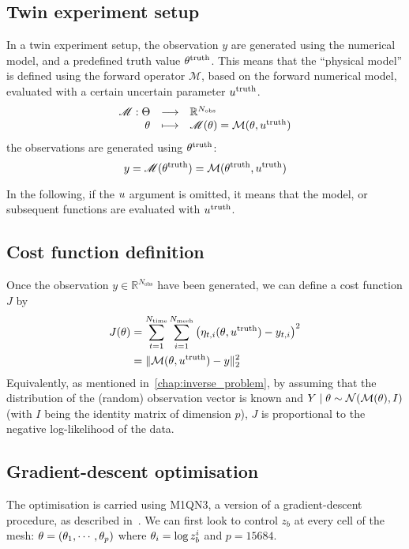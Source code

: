 \documentclass[../../Main_ManuscritThese.tex]{subfiles}
\newcommand{\zob}{z_b}
\begin{document}
\subsection{Twin experiment setup}
In a twin experiment setup, the observation $y$ are generated using
the numerical model, and a predefined truth value
$\theta^{\mathrm{truth}}$.  This means that the ``physical model'' is
defined using the forward operator $\mathscr{M}$, based on the forward
numerical model, evaluated with a certain uncertain parameter
$u^{\mathrm{truth}}$.
\begin{equation}
  \label{eq:twin_exp}
  \begin{array}{rcl}
    \mathscr{M}: \Theta &\longrightarrow & \mathbb{R}^{N_{\mathrm{obs}}} \\
    \theta & \longmapsto &\mathscr{M}(\theta) = \mathcal{M}(\theta, u^{\mathrm{truth}})
  \end{array}
\end{equation}
the observations are generated using $\theta^{\mathrm{truth}}$:
\begin{equation}
  y = \mathscr{M}(\theta^{\mathrm{truth}}) = \mathcal{M}(\theta^{\mathrm{truth}}, u^{\mathrm{truth}})
\end{equation}

In the following, if the $u$ argument is omitted, it means that the
model, or subsequent functions are evaluated with
$u^{\mathrm{truth}}$.
\subsection{Cost function definition}
Once the observation $y \in \mathbb{R}^{N_{\mathrm{obs}}}$ have been generated, we can
define a cost function $J$ by
\begin{align}
  \label{eq:cost_fun_definition}
  J(\theta) &= \sum_{t=1}^{ N_{\mathrm{time}}}\sum_{i=1}^{N_{\mathrm{mesh}}}  \left(\eta_{t,i}(\theta,u^{\mathrm{truth}}) - y_{t, i}\right)^2 \\
         &= \|\mathcal{M}(\theta,u^{\mathrm{truth}}) - y\|_2^2
\end{align}
Equivalently, as mentioned in~\cref{chap:inverse_problem}, by assuming
that the distribution of the (random) observation vector is known and
$Y \mid \theta \sim \mathcal{N}(\mathcal{M}(\theta), I)$ (with $I$ being the
identity matrix of dimension $p$), $J$ is proportional to the negative
log-likelihood of the data.

\subsection{Gradient-descent optimisation}
\label{ssec:optim_gradient}
The optimisation is carried using M1QN3, a version of a
gradient-descent procedure, as described
in~\cite{gilbert_numerical_1989}. We can first look to control $\zob$
at every cell of the mesh: $\theta = (\theta_1,\cdots, \theta_p)$ where
$\kk_i = \log\zob^i$ and $p=\num{15684}$.
\end{document}
